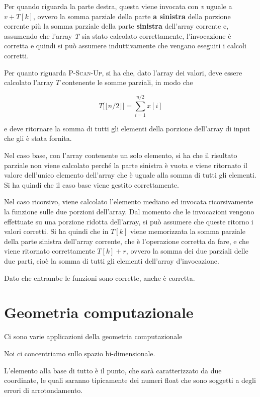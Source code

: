 Per quando riguarda la parte destra, questa viene invocata con \textit{v} uguale a $v + T[k]$, ovvero la somma parziale della parte \textbf{a sinistra} della porzione corrente più la somma parziale della parte \textbf{sinistra} dell'array corrente e, assumendo che l'array \textit{T} sia stato calcolato correttamente, l'invocazione è corretta e quindi si può assumere induttivamente che vengano eseguiti i calcoli corretti.

Per quanto riguarda \textsc{P-Scan-Up}, si ha che, dato l'array dei valori, deve essere calcolato l'array $T$ contenente le somme parziali, in modo che 

$$
T\big[\lfloor n/2 \rfloor \big] = \sum\limits_{i=1}^{n/2} x[i]
$$

e deve ritornare la somma di tutti gli elementi della porzione dell'array di input che gli è stata fornita.

Nel caso base, con l'array contenente un solo elemento, si ha che il risultato parziale non viene calcolato perché la parte sinistra è vuota e viene ritornato il valore dell'unico elemento dell'array che è uguale alla somma di tutti gli elementi. Si ha quindi che il caso base viene gestito correttamente.

Nel caso ricorsivo, viene calcolato l'elemento mediano ed invocata ricorsivamente la funzione sulle due porzioni dell'array. Dal momento che le invocazioni vengono effettuate su una porzione ridotta dell'array, si può assumere che queste ritorno i valori corretti.
Si ha quindi che in $T[k]$ viene memorizzata la somma parziale della parte sinistra dell'array corrente, che è l'operazione corretta da fare, e che viene ritornato correttamente $T[k]+r$, ovvero la somma dei due parziali delle due parti, cioè la somma di tutti gli elementi dell'array d'invocazione.

Dato che entrambe le funzioni sono corrette, anche  è corretta.

\chapter{Geometria computazionale}

Ci sono varie applicazioni della geometria computazionale

Noi ci concentriamo sullo spazio bi-dimensionale.

L'elemento alla base di tutto è il punto, che sarà caratterizzato da due coordinate, le quali saranno tipicamente dei numeri float che sono soggetti a degli errori di arrotondamento.

